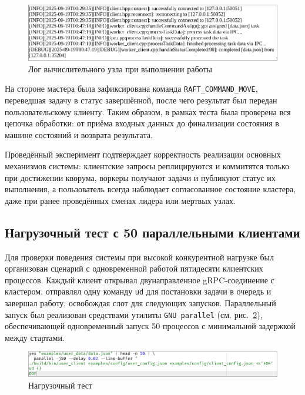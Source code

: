\begin{figure}[h!]
    \centering
    \includegraphics[width=0.8\linewidth]{inc/worker-log-task.png}
    \caption{Лог вычислительного узла при выполнении работы}
    \label{fig:worker-log-task}
\end{figure}

На стороне мастера была зафиксирована команда \texttt{RAFT\_COMMAND\_MOVE},
переведшая задачу в статус завершённой, после чего результат был передан
пользовательскому клиенту. Таким образом, в рамках теста была проверена вся
цепочка обработки: от приёма входных данных до финализации состояния в машине
состояний и возврата результата.

Проведённый эксперимент подтверждает корректность реализации основных
механизмов системы: клиентские запросы реплицируются и коммитятся только при
достижении кворума, воркеры получают задачи и публикуют статус их выполнения,
а пользователь всегда наблюдает согласованное состояние кластера, даже при
ранее проведённых сменах лидера или мертвых узлах.

\subsection{Нагрузочный тест с 50 параллельными клиентами}

Для проверки поведения системы при высокой конкурентной нагрузке был
организован сценарий с одновременной работой пятидесяти клиентских процессов.
Каждый клиент открывал двунаправленное gRPC-соединение с кластером, отправлял
одну команду \texttt{ud} для постановки задачи в очередь и завершал работу,
освобождая слот для следующих запусков. Параллельный запуск был реализован
средствами утилиты \texttt{GNU parallel} (см. рис.~\ref{fig:leader-multi-conn}),
обеспечивающей одновременный запуск 50 процессов с минимальной задержкой между
стартами.

\begin{figure}[h!]
    \centering
    \includegraphics[width=0.95\linewidth]{inc/load-multi.png}
    \caption{Нагрузочный тест}
    \label{fig:leader-multi-conn}
\end{figure}

